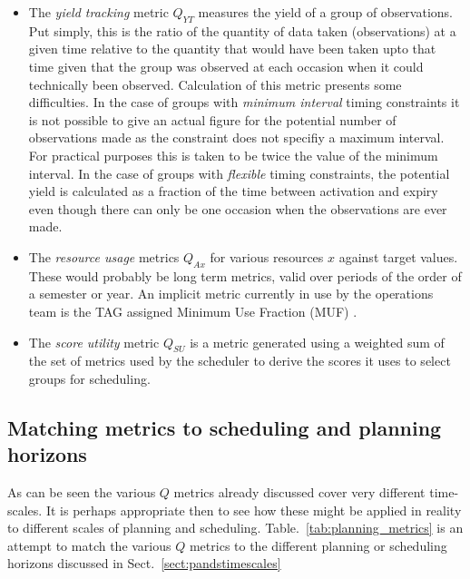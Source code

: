\begin{itemize}
\item The \emph{yield tracking} metric $Q_{YT}$ measures the yield of a group of observations. Put simply, this is the ratio of the quantity of data taken (observations) at a given time relative to the quantity that would have been taken upto that time given that the group was observed at each occasion when it could technically been observed. Calculation of this metric presents some difficulties. 
In the case of groups with \emph{minimum interval} timing constraints it is not possible to give an actual figure for the potential number of observations made as the constraint does not specifiy a maximum interval. For practical purposes this is taken to be twice the value of the minimum interval. In the case of groups with \emph{flexible} timing constraints, the potential yield is calculated as a fraction of the time between activation and expiry even though there can only be one occasion when the observations are ever made. 

\item The \emph{resource usage} metrics $Q_{Ax}$ for various resources $x$ against target values. These would probably be long term metrics, valid over periods of the order of a semester or year. An implicit metric currently in use by the operations team is the TAG assigned Minimum Use Fraction (MUF) .

\item The \emph{score utility} metric $Q_{SU}$ is a metric generated using a weighted sum of the set of metrics used by the scheduler to derive the scores it uses to select groups for scheduling. 

\end{itemize}




\subsection{Matching metrics to scheduling and planning horizons}
\label{sect:matchmetrics}
As can be seen the various $Q$ metrics already discussed cover very different time-scales. It is perhaps appropriate then to see how these might be applied in reality to different scales of planning and scheduling. Table.~\ref{tab:planning_metrics} is an attempt to match the various $Q$ metrics to the different planning or scheduling horizons discussed in Sect.~\ref{sect:pandstimescales}

